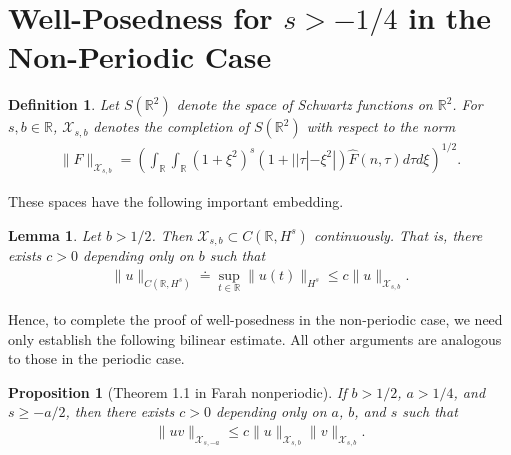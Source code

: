 \documentclass[12pt,reqno]{amsart}
\numberwithin{equation}{section}  %
\newcommand{\rr}{\mathbb{R}}
\newcommand{\wh}{\widehat}
\newtheorem{lemma}[theorem]{Lemma}
\newtheorem{proposition}[theorem]{Proposition}
\newtheorem{definition}[theorem]{Definition}
\begin{document}
\section{Well-Posedness for $s > -1/4$ in the Non-Periodic Case} 
\label{sec:non-periodic-case}
%
%
\begin{definition}
  Let $S(\rr^{2})$ denote the space of Schwartz functions on
  $\rr^{2}$.  For $s, b \in \rr$, $\mathcal{X}_{s,b}$
  denotes the completion of $S(\rr^{2})$ with
  respect to the norm
  \begin{equation}
  \begin{split}
    \|F\|_{\mathcal{X}_{s,b}} = \left( \int_{\rr} \int_{\rr} (1 + \xi^{2})^{s}
    (1 + | | \tau | - \xi^{2} |) \wh{F}(n, \tau) d \tau d \xi \right)^{1/2}.
  \end{split}
  \label{eqn:bous-norm-real}
  \end{equation}
\end{definition}
%
These spaces have the following important embedding.
\begin{lemma}
  Let $b > 1/2$. Then $\mathcal{X}_{s, b} \subset C(\rr, H^s)$ continuously. That is,
  there exists $c>0$ depending only on $b$ such that
%
%
\begin{equation*}
\begin{split}
  \| u \|_{C(\rr, H^s)} \doteq \sup_{t \in \rr} \| u(t) \|_{H^s} 
  \le c \| u \|_{\mathcal{X}_{s,b}}.
\end{split}
\end{equation*}
%
\label{lem:real-embedding}
\end{lemma}

%
Hence, to complete the proof of well-posedness in the non-periodic case, we need
only establish the following bilinear estimate. All other arguments are
analogous to those in the periodic case.
%
\begin{proposition}[Theorem 1.1 in Farah nonperiodic]
\label{prop:bilin-est-real}
If $b > 1/2$, $a > 1/4$, and $s \ge -a/2$, 
  then there exists $c > 0$ depending only on $a$, $b$, and $s$ such that
  \begin{equation*}
  \begin{split}
    \| uv \|_{\mathcal{X}_{s,-a}} \le c \| u \|_{\mathcal{X}_{s,b}} \| v \|_{\mathcal{X}_{s,b}}.
  \end{split}
  \end{equation*}
\end{proposition}
%
%
%
%
%
%
%
%
%
%
\end{document}
